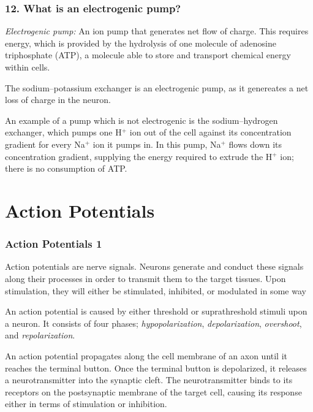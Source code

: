 \subsubsection{12. What is an electrogenic pump?}


\textit{Electrogenic pump:} An ion pump that generates net flow of charge. This requires energy, which is provided by the hydrolysis of one molecule of adenosine triphosphate (ATP), a molecule able to store and transport chemical energy within cells.

The sodium–potassium exchanger is an electrogenic pump, as it genereates a net loss of charge in the neuron. 

An example of a pump which is not electrogenic is the sodium–hydrogen exchanger, which pumps one H$^+$ ion out of the cell against its concentration gradient for every Na$^+$ ion it pumps in. In this pump, Na$^+$ flows down its concentration gradient, supplying the energy required to extrude the H$^+$ ion; there is no consumption of ATP.





\section{Action Potentials}

\subsubsection{Action Potentials 1}

Action potentials are nerve signals. Neurons generate and conduct these signals along their processes in order to transmit them to the target tissues. Upon stimulation, they will either be stimulated, inhibited, or modulated in some way

An action potential is caused by either threshold or suprathreshold stimuli upon a neuron. It consists of four phases; \textit{hypopolarization}, \textit{depolarization}, \textit{overshoot}, and \textit{repolarization}. 

An action potential propagates along the cell membrane of an axon until it reaches the terminal button. Once the terminal button is depolarized, it releases a neurotransmitter into the synaptic cleft. The neurotransmitter binds to its receptors on the postsynaptic membrane of the target cell, causing its response either in terms of stimulation or inhibition.

